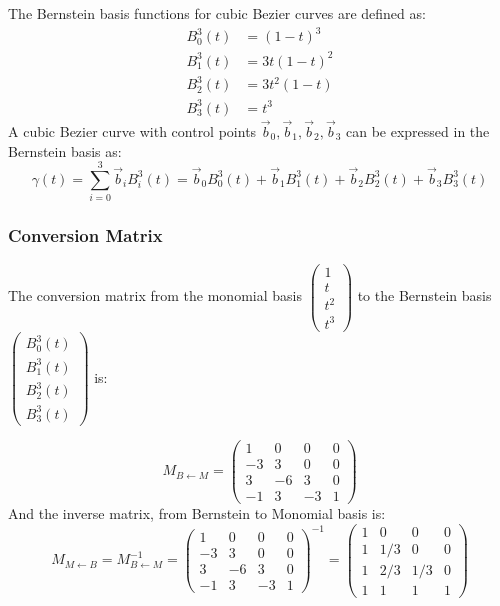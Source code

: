 \documentclass{article}
\begin{document}
The Bernstein basis functions for cubic Bezier curves are defined as:
\begin{align*}
B_{0}^{3}(t) &= (1-t)^3 \\
B_{1}^{3}(t) &= 3t(1-t)^2 \\
B_{2}^{3}(t) &= 3t^2(1-t) \\
B_{3}^{3}(t) &= t^3
\end{align*}
A cubic Bezier curve with control points \(\vec{b}_0, \vec{b}_1, \vec{b}_2, \vec{b}_3\) can be expressed in the Bernstein basis as:
\begin{equation}
\gamma(t) = \sum_{i=0}^{3} \vec{b}_i B_{i}^{3}(t) = \vec{b}_0 B_{0}^{3}(t) + \vec{b}_1 B_{1}^{3}(t) + \vec{b}_2 B_{2}^{3}(t) + \vec{b}_3 B_{3}^{3}(t)
\end{equation}

\subsubsection{Conversion Matrix}

The conversion matrix from the monomial basis \(\begin{pmatrix} 1 \\ t \\ t^2 \\ t^3 \end{pmatrix}\) to the Bernstein basis \(\begin{pmatrix} B_{0}^{3}(t) \\ B_{1}^{3}(t) \\ B_{2}^{3}(t) \\ B_{3}^{3}(t) \end{pmatrix}\) is:

\[ M_{B \leftarrow M} = \begin{pmatrix} 1 & 0 & 0 & 0 \\ -3 & 3 & 0 & 0 \\ 3 & -6 & 3 & 0 \\ -1 & 3 & -3 & 1 \end{pmatrix} \]
And the inverse matrix, from Bernstein to Monomial basis is:
 \[ M_{M \leftarrow B} = M_{B \leftarrow M}^{-1} = \begin{pmatrix} 1 & 0 & 0 & 0 \\ -3 & 3 & 0 & 0 \\ 3 & -6 & 3 & 0 \\ -1 & 3 & -3 & 1 \end{pmatrix}^{-1} = \begin{pmatrix} 1 & 0 & 0 & 0 \\ 1 & 1/3 & 0 & 0 \\ 1 & 2/3 & 1/3 & 0 \\ 1 & 1 & 1 & 1 \end{pmatrix} \]
\end{document}

